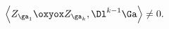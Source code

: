 \begin{equation}
\left< Z_{\ga_1} \oxyox Z_{\ga_k},\Dl^{k-1}\Ga \right> \neq 0.
\label{eq:compatibility}%
\end{equation}

